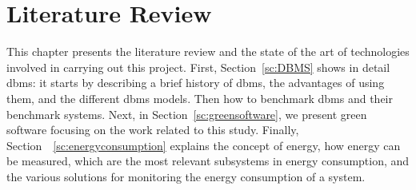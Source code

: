 \chapter{Literature Review}
\label{cha:StateofArt}

This chapter presents the literature review and the state of the art of technologies involved in carrying out this project.  First, Section~\ref{sc:DBMS} shows in detail \gls{dbms}: it starts by describing a brief history of \gls{dbms}, the advantages of using them, and the different \gls{dbms} models. Then how to benchmark \gls{dbms} and their benchmark systems. Next, in Section~\ref{sc:greensoftware}, we present green software focusing on the work related to this study. 
Finally, Section~~\ref{sc:energyconsumption} explains the concept of energy, how energy can be measured, which are the most relevant subsystems in energy consumption, and the various solutions for monitoring the energy consumption of a system.





